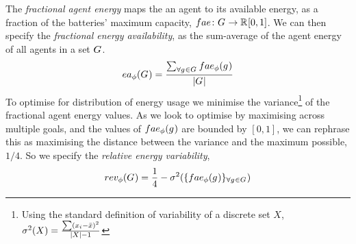 \newcommand{\functionEnergyAvailable}[2]{
	\ifx \\#1\\
	\functionSignature{ea_{\varTime{}{}}}{\setAgents{}{}}
	\else
	\functionSignature{ea_{\varTime{}{}}}{#1}
	\fi
}
The \textit{fractional agent energy} maps the an agent to its available energy, as a fraction of the batteries' maximum capacity, $\formalAgentEnergyAvailable{}{}$. We can then specify the \textit{fractional energy availability}, as the sum-average of the agent energy of all agents in a set $G_{}^{}$.
\begin{equation}
	\functionEnergyAvailable{}{} 
	= \dfrac{\sum_{\forall \varAgent{}{} \in \setAgents{}{}} \functionAgentEnergyAvailable{\varAgent{i}{}}{}}
	{\funcSize{\setAgents{}{}}}
\end{equation}
To optimise for distribution of energy usage we minimise the variance\footnote{Using the standard definition of variability of a discrete set $X$, $\sigma^2(X) = \frac{\sum (x_i - \bar{x})^2}{\lvert X \rvert-1}$} of the fractional agent energy values. As we look to optimise by maximising across multiple goals, and the values of $\functionAgentEnergyAvailable{}{}$ are bounded by $[0, 1]$, we can rephrase this as maximising the distance between the variance and the maximum possible, $1/4$. So we specify the \textit{relative energy variability},
\begin{equation}     	
	\functionEnergyVariability{}{} 
	= \frac{1}{4} - \sigma^2(
	\lbrace \functionAgentEnergyAvailable{}{}
	\rbrace_{\forall \varAgent{}{} \in \setAgents{}{}}
	)
\end{equation}


